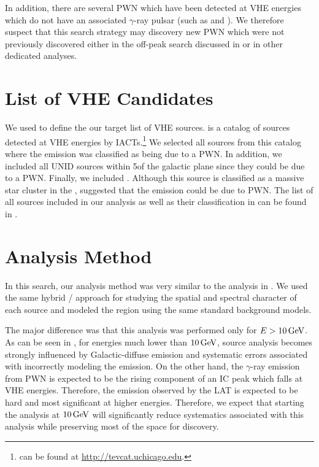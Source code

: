 In addition, there are several \ac{PWN} which have been detected at \ac{VHE}
energies which do not have an associated $\gamma$-ray pulsar (such as
 and ).  We therefore suspect that this search
strategy may discovery new \ac{PWN} which were not previously discovered
either in the off-peak search discussed in  or in other
dedicated analyses.

\section{List of \ac{VHE}  Candidates}



We used \tevcat to define the our target list of \ac{VHE} sources.
\tevcat is a catalog of sources detected at
\ac{VHE} energies by \acp{IACT}.\footnote{\tevcat can be found at
\url{http://tevcat.uchicago.edu}.}  We selected all sources from
this catalog where the emission was classified as being due to a
\ac{PWN}. In addition, we included all \ac{UNID} sources within
5\degree of the galactic plane since they could be due to a \ac{PWN}.  Finally,
we included . Although this source is classified as a massive
star cluster in the \tevcat, 
\cite{de-naurois_2013a_galactic-h.e.s.s.}
suggested that the emission could be due to \ac{PWN}. The list of all sources
included in our analysis as well as their classification in \tevcat can
be found in .

\section{Analysis Method}

In this search, our analysis method was very similar to the analysis
in . We used the same hybrid \pointlike/\gtlike
approach for studying the spatial and spectral character of each source
and modeled the region using the same standard background models.

The major difference was that this analysis
was performed only for $E>10\,\text{GeV}$.  As can be seen in
, for energies much lower than $10\,\text{GeV}$,
source analysis becomes strongly influenced by Galactic-diffuse
emission and systematic errors associated with incorrectly modeling
the emission. On the other hand, the $\gamma$-ray emission from \ac{PWN}
is expected to be the rising component of an \ac{IC} peak which falls
at \ac{VHE} energies. Therefore, the emission observed by the \ac{LAT} is
expected to be hard and most significant at higher energies. Therefore,
we expect that starting the analysis  at $10\,\text{GeV}$ will
significantly reduce systematics associated with this analysis while
preserving most of the space for discovery.

